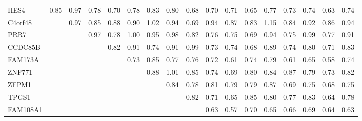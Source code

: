 \begin{longtable}{lrrrrrrrrrrrrrrrr}
\bottomrule
\endlastfoot
HES4          &          0.85 &       0.97 &          0.78 &          0.70 &         0.78 &        0.83 &        0.80 &           0.68 &          0.70 &                0.71 &           0.65 &          0.77 &       0.73 &         0.74 &           0.63 &          0.74 \\
C4orf48       &               &       0.97 &          0.85 &          0.88 &         0.90 &        1.02 &        0.94 &           0.69 &          0.94 &                0.87 &           0.83 &          1.15 &       0.84 &         0.92 &           0.86 &          0.94 \\
PRR7          &               &            &          0.97 &          0.78 &         1.00 &        0.95 &        0.98 &           0.82 &          0.76 &                0.75 &           0.69 &          0.94 &       0.75 &         0.99 &           0.77 &          0.91 \\
CCDC85B       &               &            &               &          0.82 &         0.91 &        0.74 &        0.91 &           0.99 &          0.73 &                0.74 &           0.68 &          0.89 &       0.74 &         0.80 &           0.71 &          0.83 \\
FAM173A       &               &            &               &               &         0.73 &        0.85 &        0.77 &           0.76 &          0.72 &                0.61 &           0.74 &          0.79 &       0.61 &         0.65 &           0.58 &          0.74 \\
ZNF771        &               &            &               &               &              &        0.88 &        1.01 &           0.85 &          0.74 &                0.69 &           0.80 &          0.84 &       0.87 &         0.79 &           0.73 &          0.82 \\
ZFPM1         &               &            &               &               &              &             &        0.84 &           0.78 &          0.81 &                0.79 &           0.79 &          0.87 &       0.69 &         0.75 &           0.68 &          0.75 \\
TPGS1         &               &            &               &               &              &             &             &           0.82 &          0.71 &                0.65 &           0.85 &          0.80 &       0.77 &         0.83 &           0.64 &          0.78 \\
FAM108A1      &               &            &               &               &              &             &             &                &          0.63 &                0.57 &           0.70 &          0.65 &       0.66 &         0.69 &           0.64 &          0.63 \\

\end{longtable}
